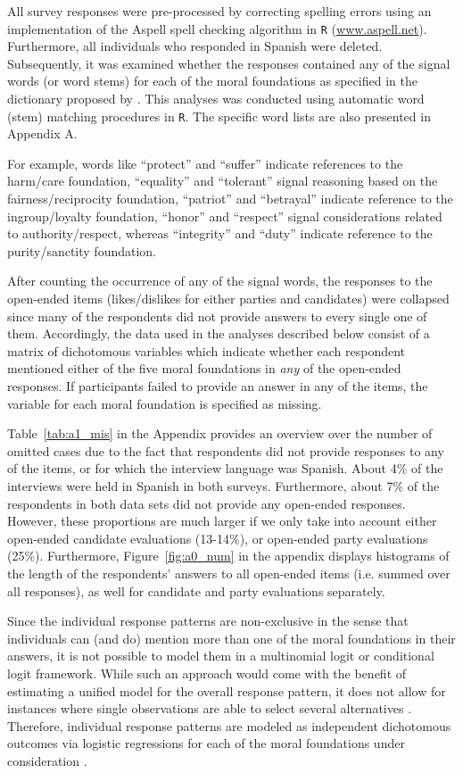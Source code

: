 \documentclass[12pt]{article}
\begin{document}
All survey responses were pre-processed by correcting spelling errors using an implementation of the Aspell spell checking algorithm in \texttt{R} (\url{www.aspell.net}). Furthermore, all individuals who responded in Spanish were deleted. Subsequently, it was examined whether the responses contained any of the signal words (or word stems) for each of the moral foundations as specified in the dictionary proposed by \citet{graham2009liberals}. This analyses was conducted using automatic word (stem) matching procedures in \texttt{R}. The specific word lists are also presented in Appendix A. 

For example, words like ``protect'' and ``suffer'' indicate references to the harm/care foundation, ``equality'' and ``tolerant'' signal reasoning based on the fairness/reciprocity foundation, ``patriot'' and ``betrayal'' indicate reference to the ingroup/loyalty foundation, ``honor'' and ``respect'' signal considerations related to authority/respect, whereas ``integrity'' and ``duty'' indicate reference to the purity/sanctity foundation.

After counting the occurrence of any of the signal words, the responses to the open-ended items (likes/dislikes for either parties and candidates) were collapsed since many of the respondents did not provide answers to every single one of them. Accordingly, the data used in the analyses described below consist of a matrix of dichotomous variables which indicate whether each respondent mentioned either of the five moral foundations in \textit{any} of the open-ended responses. If participants failed to provide an answer in any of the items, the variable for each moral foundation is specified as missing.

Table~\ref{tab:a1_mis} in the Appendix provides an overview over the number of omitted cases due to the fact that respondents did not provide responses to any of the items, or for which the interview language was Spanish. About 4\% of the interviews were held in Spanish in both surveys. Furthermore, about 7\% of the respondents in both data sets did not provide any open-ended responses. However, these proportions are much larger if we only take into account either open-ended candidate evaluations (13-14\%), or open-ended party evaluations (25\%). Furthermore, Figure~\ref{fig:a0_num} in the appendix displays histograms of the length of the respondents' answers to all open-ended items (i.e. summed over all responses), as well for candidate and party evaluations separately.

Since the individual response patterns are non-exclusive in the sense that individuals can (and do) mention more than one of the moral foundations in their answers, it is not possible to model them in a multinomial logit or conditional logit framework. While such an approach would come with the benefit of estimating a unified model for the overall response pattern, it does not allow for instances where single observations are able to select several alternatives \citep[but see][]{gilbert2007models}. Therefore, individual response patterns are modeled as independent dichotomous outcomes via logistic regressions for each of the moral foundations under consideration \citep[c.f. for example][]{agresti1999modeling}.
\end{document}
